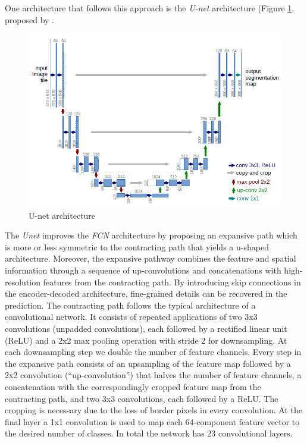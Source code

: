 One architecture that follows this approach is the \textit{U-net} architecture (Figure \ref{fig:unet_architecture}, proposed by \citep{ronneberger2015u}.
\begin{figure}
\centerline{\includegraphics[scale=0.6]{images/chapter_2/unet.png}}
\caption{U-net architecture \citep{ronneberger2015u}}
\label{fig:unet_architecture}
\end{figure}
The \textit{Unet} improves the \textit{FCN} architecture by proposing an expansive path which is more or less symmetric to the contracting path that yields a u-shaped architecture. Moreover, the expansive pathway combines the feature and spatial information through a sequence of up-convolutions and concatenations with high-resolution features from the contracting path. By introducing skip connections in the encoder-decoded architecture, fine-grained details can be recovered in the prediction. The contracting path follows the typical architecture of a convolutional network. It consists of repeated applications of two 3x3 convolutions (unpadded convolutions), each followed by a rectified linear unit (ReLU) and a 2x2 max pooling operation with stride 2 for downsampling. At each downsampling step we double the number of feature channels. Every step in the expansive path consists of an upsampling of the feature map followed by a 2x2 convolution (“up-convolution”) that halves the number of feature channels, a concatenation with the correspondingly cropped feature map from the contracting path, and two 3x3 convolutions, each followed by a ReLU. The cropping is necessary due to the loss of border pixels in every convolution. At the final layer a 1x1 convolution is used to map each 64-component feature vector to the desired number of classes. In total the network has 23 convolutional layers.

